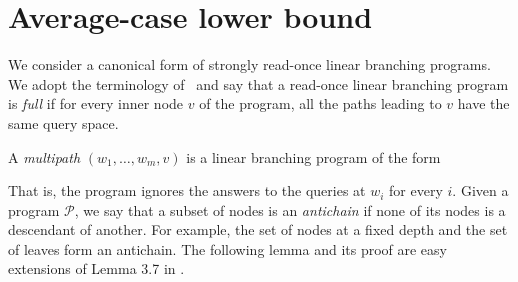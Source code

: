 \documentclass[10pt,a4paper]{article}
\theoremstyle{definition}
\theoremstyle{remark}
\newcommand{\calP}{\mathcal{P}}
\newcommand{\sreadonce}{strongly read-once}
\newcommand{\readonce}{read-once}
\begin{document}
\section{Average-case lower bound}

We consider a canonical form of \sreadonce{} linear branching programs. We adopt the terminology of~\cite{DBLP:journals/cc/ChenKKSZ15} and say that a \readonce{} linear branching program is \emph{full} if for every inner node $v$ of the program, all the paths leading to $v$ have the same query space.

A \emph{multipath} $(w_1, \ldots, w_m, v)$ is a linear branching program of the form
\begin{center}
\end{center}

That is, the program ignores the answers to the queries at $w_i$ for every $i$. Given a program $\calP$, we say that a subset of nodes is an \emph{antichain} if none of its nodes is a descendant of another. For example, the set of nodes at a fixed depth and the set of leaves form an antichain. The following lemma and its proof are easy extensions of Lemma 3.7 in \cite{DBLP:journals/cc/ChenKKSZ15}.
\end{document}
